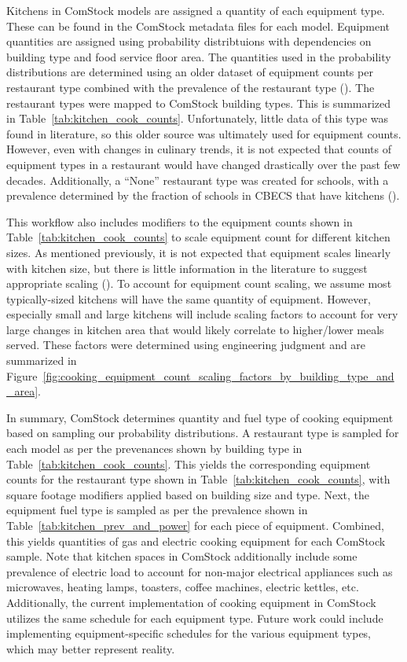 Kitchens in ComStock models are assigned a quantity of each equipment type. These can be found in the ComStock metadata files for each model. Equipment quantities are assigned using probability distribtuions with dependencies on building type and food service floor area. The quantities used in the probability distributions are determined using an older dataset of equipment counts per restaurant type combined with the prevalence of the restaurant type (\cite{com_food_service_equip}). The restaurant types were mapped to ComStock building types. This is summarized in Table~\ref{tab:kitchen_cook_counts}. Unfortunately, little data of this type was found in literature, so this older source was ultimately used for equipment counts. However, even with changes in culinary trends, it is not expected that counts of equipment types in a restaurant would have changed drastically over the past few decades. Additionally, a “None” restaurant type was created for schools, with a prevalence determined by the fraction of schools in CBECS that have kitchens (\cite{eia2012cbecs}).

This workflow also includes modifiers to the equipment counts shown in Table~\ref{tab:kitchen_cook_counts} to scale equipment count for different kitchen sizes. As mentioned previously, it is not expected that equipment scales linearly with kitchen size, but there is little information in the literature to suggest appropriate scaling (\cite{qsr_50pct_svs}). To account for equipment count scaling, we assume most typically-sized kitchens will have the same quantity of equipment. However, especially small and large kitchens will include scaling factors to account for very large changes in kitchen area that would likely correlate to higher/lower meals served. These factors were determined using engineering judgment and are summarized in Figure~\ref{fig:cooking_equipment_count_scaling_factors_by_building_type_and_area}.

In summary, ComStock determines quantity and fuel type of cooking equipment based on sampling our probability distributions. A restaurant type is sampled for each model as per the prevenances shown by building type in Table~\ref{tab:kitchen_cook_counts}. This yields the corresponding equipment counts for the restaurant type shown in Table~\ref{tab:kitchen_cook_counts}, with square footage modifiers applied based on building size and type. Next, the equipment fuel type is sampled as per the prevalence shown in Table~\ref{tab:kitchen_prev_and_power} for each piece of equipment. Combined, this yields quantities of gas and electric cooking equipment for each ComStock sample. Note that kitchen spaces in ComStock additionally include some prevalence of electric load to account for non-major electrical appliances such as microwaves, heating lamps, toasters, coffee machines, electric kettles, etc. Additionally, the current implementation of cooking equipment in ComStock utilizes the same schedule for each equipment type. Future work could include implementing equipment-specific schedules for the various equipment types, which may better represent reality.


